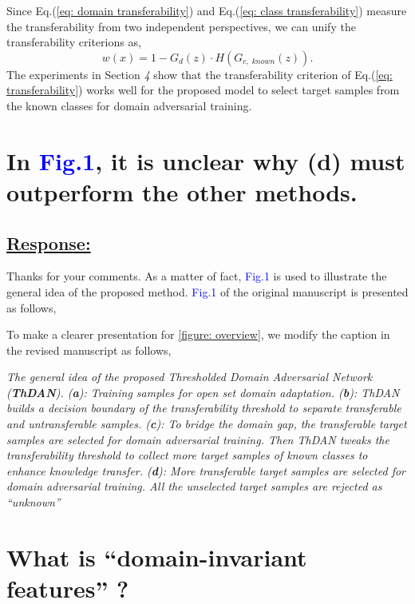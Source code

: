 Since Eq.(\ref{eq: domain transferability}) and Eq.(\ref{eq: class transferability}) measure the transferability from two independent perspectives, we can unify the transferability criterions as,
\begin{equation}
    \label{eq: transferability}
    w(x)=1-G_d(z)\cdot H(G_{c,\; known}(z)).
\end{equation}
The experiments in Section \textit{4} show that the transferability criterion of Eq.(\ref{eq: transferability}) works well for the proposed model to select target samples from the known classes for domain adversarial training.


\section{In \textcolor{blue}{Fig.1}, it is unclear why (d) must outperform the other methods.}
\subsection*{\underline{\textbf{Response:}}}

Thanks for your comments.
As a matter of fact, \textcolor{blue}{Fig.1} is used to illustrate the general idea of the proposed method.
\textcolor{blue}{Fig.1} of the original manuscript is presented as follows,

To make a clearer presentation for \figurename{\ref{figure: overview}}, we modify the caption in the revised manuscript as follows,
\begin{siderules}
    \textit{
        \footnotesize
        The general idea of the proposed Thresholded Domain Adversarial Network (\textit{\textbf{ThDAN}}).
        (\textbf{a}): Training samples for open set domain adaptation.
        (\textbf{b}): ThDAN builds a decision boundary of the transferability threshold to separate transferable and untransferable samples. 
        (\textbf{c}): To bridge the domain gap, the transferable target samples are selected for domain adversarial training.
        Then ThDAN tweaks the transferability threshold to collect more target samples of known classes to enhance knowledge transfer.
        (\textbf{d}): More transferable target samples are selected for domain adversarial training. All the unselected target samples are rejected as ``unknown''
    }
\end{siderules}


\section{What is ``domain-invariant features'' ?}
